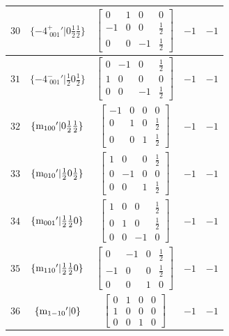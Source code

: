 \documentclass[fleqn,8pt]{jsarticle}
\begin{document}
\begin{longtable}{ccccc}
$ 30 $ & $ \{-4^{+}_{\,\,001}{}'|0 \frac{1}{2} \frac{1}{2}\} $ & $ \begin{bmatrix} 0 & 1 & 0 & 0 \\ -1 & 0 & 0 & \frac{1}{2} \\ 0 & 0 & -1 & \frac{1}{2} \end{bmatrix} $ & $ -1 $ & $ -1 $ \\ \hline
$ 31 $ & $ \{-4^{-}_{\,\,001}{}'|\frac{1}{2} 0 \frac{1}{2}\} $ & $ \begin{bmatrix} 0 & -1 & 0 & \frac{1}{2} \\ 1 & 0 & 0 & 0 \\ 0 & 0 & -1 & \frac{1}{2} \end{bmatrix} $ & $ -1 $ & $ -1 $ \\ \hline
$ 32 $ & $ \{{\rm m}_{100}{}'|0 \frac{1}{2} \frac{1}{2}\} $ & $ \begin{bmatrix} -1 & 0 & 0 & 0 \\ 0 & 1 & 0 & \frac{1}{2} \\ 0 & 0 & 1 & \frac{1}{2} \end{bmatrix} $ & $ -1 $ & $ -1 $ \\ \hline
$ 33 $ & $ \{{\rm m}_{010}{}'|\frac{1}{2} 0 \frac{1}{2}\} $ & $ \begin{bmatrix} 1 & 0 & 0 & \frac{1}{2} \\ 0 & -1 & 0 & 0 \\ 0 & 0 & 1 & \frac{1}{2} \end{bmatrix} $ & $ -1 $ & $ -1 $ \\ \hline
$ 34 $ & $ \{{\rm m}_{001}{}'|\frac{1}{2} \frac{1}{2} 0\} $ & $ \begin{bmatrix} 1 & 0 & 0 & \frac{1}{2} \\ 0 & 1 & 0 & \frac{1}{2} \\ 0 & 0 & -1 & 0 \end{bmatrix} $ & $ -1 $ & $ -1 $ \\ \hline
$ 35 $ & $ \{{\rm m}_{110}{}'|\frac{1}{2} \frac{1}{2} 0\} $ & $ \begin{bmatrix} 0 & -1 & 0 & \frac{1}{2} \\ -1 & 0 & 0 & \frac{1}{2} \\ 0 & 0 & 1 & 0 \end{bmatrix} $ & $ -1 $ & $ -1 $ \\ \hline
$ 36 $ & $ \{{\rm m}_{1-10}{}'|0\} $ & $ \begin{bmatrix} 0 & 1 & 0 & 0 \\ 1 & 0 & 0 & 0 \\ 0 & 0 & 1 & 0 \end{bmatrix} $ & $ -1 $ & $ -1 $ \\ \hline

\end{longtable}
\end{document}
